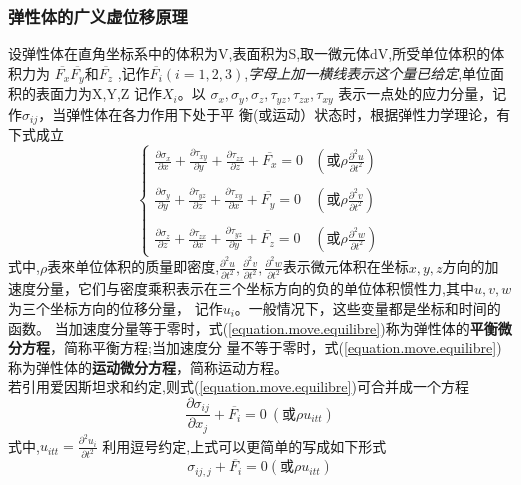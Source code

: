 \documentclass{book}
\begin{document}
\subsubsection{弹性体的广义虚位移原理}
设弹性体在直角坐标系中的体积为V,表面积为S,取一微元体dV,所受单位体积的体积力为 $\overline{F_x} \overline{F_y}\mbox{和} \overline{F_z} $ ,记作$\overline{F_i}(i=1,2,3)$,\emph{字母上加一横线表示这个量已给定},单位面积的表面力为X,Y,Z 记作$X_i$。以
$ \sigma_x, \sigma_y, \sigma_z, \tau_{yz},\tau_{zx},\tau_{xy} $
表示一点处的应力分量，记作$\sigma_{ij}$，当弹性体在各力作用下处于平 衡(或运动）状态时，根据弹性力学理论，有下式成立
\begin{equation}
  \left\{
	\begin{array}{ll}
	 \frac{\partial \sigma_x}{\partial x}+ \frac{\partial \tau_{xy}}{\partial y}+ \frac{\partial \tau_{zx}}{\partial z}+ \overline{F_x}=0 & (\mbox{或}\rho\frac{\partial ^2u}{\partial t^2}) \\\\
	 \frac{\partial \sigma_y}{\partial y}+ \frac{\partial \tau_{yz}}{\partial z}+ \frac{\partial \tau_{xy}}{\partial x}+ \overline{F_y}=0 & (\mbox{或}\rho\frac{\partial ^2v}{\partial t^2}) \\\\
	 \frac{\partial \sigma_z}{\partial z}+ \frac{\partial \tau_{zx}}{\partial x}+ \frac{\partial \tau_{yz}}{\partial y}+ \overline{F_z}=0 & (\mbox{或}\rho\frac{\partial ^2w}{\partial t^2})
	\end{array}
	\right.
\label{equation.move.equilibre}
\end{equation}
式中,$\rho$表來单位体积的质量即密度,$\frac{\partial ^2u}{\partial t^2},\frac{\partial ^2v}{\partial t^2},\frac{\partial ^2w}{\partial t^2}$表示微元体积在坐标$x,y,z$方向的加速度分量，它们与密度乘积表示在三个坐标方向的负的单位体积惯性力,其中$u,v,w$为三个坐标方向的位移分量，
记作$u_i$。一般情况下，这些变量都是坐标和时间的函数。
当加速度分量等于零时，式(\ref{equation.move.equilibre})称为弹性体的\textbf{平衡微分方程}，简称平衡方程;当加速度分
量不等于零时，式(\ref{equation.move.equilibre})称为弹性体的\textbf{运动微分方程}，简称运动方程。
\\
若引用爱因斯坦求和约定,则式(\ref{equation.move.equilibre})可合并成一个方程
\begin{equation}
 \frac{\partial \sigma_{ij}}{\partial x_j} + \overline{F_i}=0 ~(\mbox{或}\rho u_{itt})
\end{equation}
式中,$u_{itt}=\frac{\partial ^2 u_i}{\partial t^2}$
利用逗号约定,上式可以更简单的写成如下形式
\begin{equation}
 \sigma_{ij,j} + \overline{F_i}=0 (\mbox{或}\rho u_{itt})
\end{equation}
\end{document}
